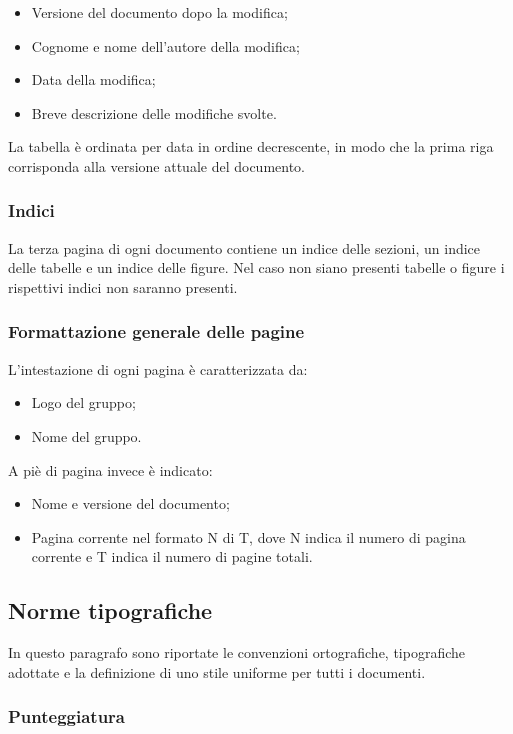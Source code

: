 \begin{itemize}
\item Versione del documento dopo la modifica;
\item Cognome e nome dell'autore della modifica;
\item Data della modifica;
\item Breve descrizione delle modifiche svolte.
\end{itemize}
La tabella è ordinata per data in ordine decrescente, in modo che la prima riga corrisponda alla versione attuale del documento.

\subsubsection{Indici}
La terza pagina di ogni documento contiene un indice delle sezioni, un indice delle tabelle e un indice delle figure. Nel caso non siano presenti tabelle o figure i rispettivi indici non saranno presenti.

\subsubsection{Formattazione generale delle pagine}
L'intestazione di ogni pagina è caratterizzata da:

\begin{itemize}
\item Logo del gruppo;
\item Nome del gruppo.
\end{itemize} 
A piè di pagina invece è indicato:
\begin{itemize}
\item Nome e versione del documento;
\item Pagina corrente nel formato N di T, dove N indica il numero di pagina corrente e T indica il numero di pagine totali.
\end{itemize} 

\subsection{Norme tipografiche}
In questo paragrafo sono riportate le convenzioni ortografiche, tipografiche adottate e la definizione di uno stile uniforme per tutti i documenti.

\subsubsection{Punteggiatura}

